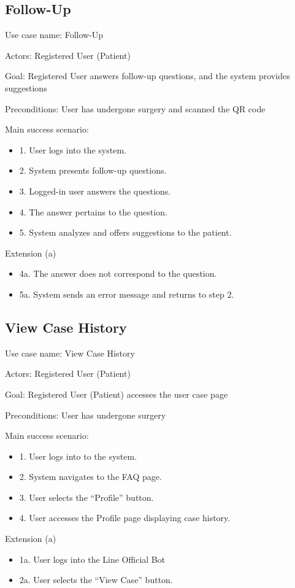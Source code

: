 \documentclass[12pt,oneside,openright,a4paper]{cpe-english-project}
\begin{document}
      \subsection{Follow-Up}
        \qquad Use case name: Follow-Up \par
        \qquad Actors: Registered User (Patient) \par
        \qquad Goal: Registered User answers follow-up questions, and the system provides suggestions \par
        \qquad Preconditions: User has undergone surgery and scanned the QR code \par
        \qquad Main success scenario:
        \begin{itemize}
          \item[] 1. User logs into the system.
          \item[] 2. System presents follow-up questions.
          \item[] 3. Logged-in user answers the questions.
          \item[] 4. The answer pertains to the question.
          \item[] 5. System analyzes and offers suggestions to the patient.
        \end{itemize}
        \qquad Extension (a)
        \begin{itemize}
          \item[] 4a. The answer does not correspond to the question.
          \item[] 5a. System sends an error message and returns to step 2.
        \end{itemize}

      \subsection{View Case History}
        \qquad Use case name: View Case History \par
        \qquad Actors: Registered User (Patient) \par
        \qquad Goal: Registered User (Patient) accesses the user case page \par
        \qquad Preconditions: User has undergone surgery \par
        \qquad Main success scenario:
        \begin{itemize}
          \item[] 1. User logs into to the system.
          \item[] 2. System navigates to the FAQ page.
          \item[] 3. User selects the “Profile” button.
          \item[] 4. User accesses the Profile page displaying case history.
        \end{itemize}
        \qquad Extension (a)
        \begin{itemize}
          \item[] 1a. User logs into the Line Official Bot
          \item[] 2a. User selects the “View Case” button.
        \end{itemize}
\end{document}
